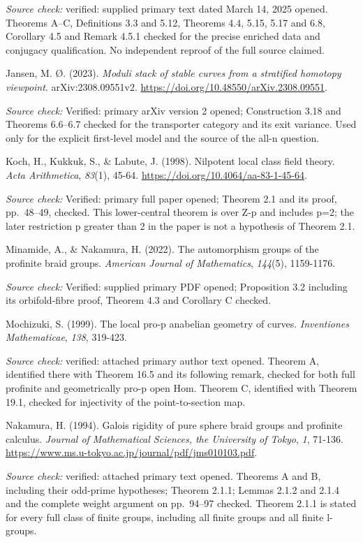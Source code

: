 \documentclass[10pt,a4paper]{article}
\begin{document}
\emph{Source check:} verified: supplied primary text dated March 14, 2025 opened. Theorems A--C, Definitions 3.3 and 5.12, Theorems 4.4, 5.15, 5.17 and 6.8, Corollary 4.5 and Remark 4.5.1 checked for the precise enriched data and conjugacy qualification. No independent reproof of the full source claimed.

Jansen, M. \O. (2023). \emph{Moduli stack of stable curves from a stratified homotopy viewpoint}. arXiv:2308.09551v2. \url{https://doi.org/10.48550/arXiv.2308.09551}.

\emph{Source check:} Verified: primary arXiv version 2 opened; Construction 3.18 and Theorems 6.6--6.7 checked for the transporter category and its exit variance. Used only for the explicit first-level model and the source of the all-n question.

Koch, H., Kukkuk, S., \& Labute, J. (1998). Nilpotent local class field theory. \emph{Acta Arithmetica}, \emph{83}(1), 45-64. \url{https://doi.org/10.4064/aa-83-1-45-64}.

\emph{Source check:} Verified: primary full paper opened; Theorem 2.1 and its proof, pp.~48--49, checked. This lower-central theorem is over Z-p and includes p=2; the later restriction p greater than 2 in the paper is not a hypothesis of Theorem 2.1.

Minamide, A., \& Nakamura, H. (2022). The automorphism groups of the profinite braid groups. \emph{American Journal of Mathematics}, \emph{144}(5), 1159-1176.

\emph{Source check:} Verified: supplied primary PDF opened; Proposition 3.2 including its orbifold-fibre proof, Theorem 4.3 and Corollary C checked.

Mochizuki, S. (1999). The local pro-p anabelian geometry of curves. \emph{Inventiones Mathematicae}, \emph{138}, 319-423.

\emph{Source check:} verified: attached primary author text opened. Theorem A, identified there with Theorem 16.5 and its following remark, checked for both full profinite and geometrically pro-p open Hom. Theorem C, identified with Theorem 19.1, checked for injectivity of the point-to-section map.

Nakamura, H. (1994). Galois rigidity of pure sphere braid groups and profinite calculus. \emph{Journal of Mathematical Sciences, the University of Tokyo}, \emph{1}, 71-136. \url{https://www.ms.u-tokyo.ac.jp/journal/pdf/jms010103.pdf}.

\emph{Source check:} verified: attached primary text opened. Theorems A and B, including their odd-prime hypotheses; Theorem 2.1.1; Lemmas 2.1.2 and 2.1.4 and the complete weight argument on pp.~94--97 checked. Theorem 2.1.1 is stated for every full class of finite groups, including all finite groups and all finite l-groups.
\end{document}
